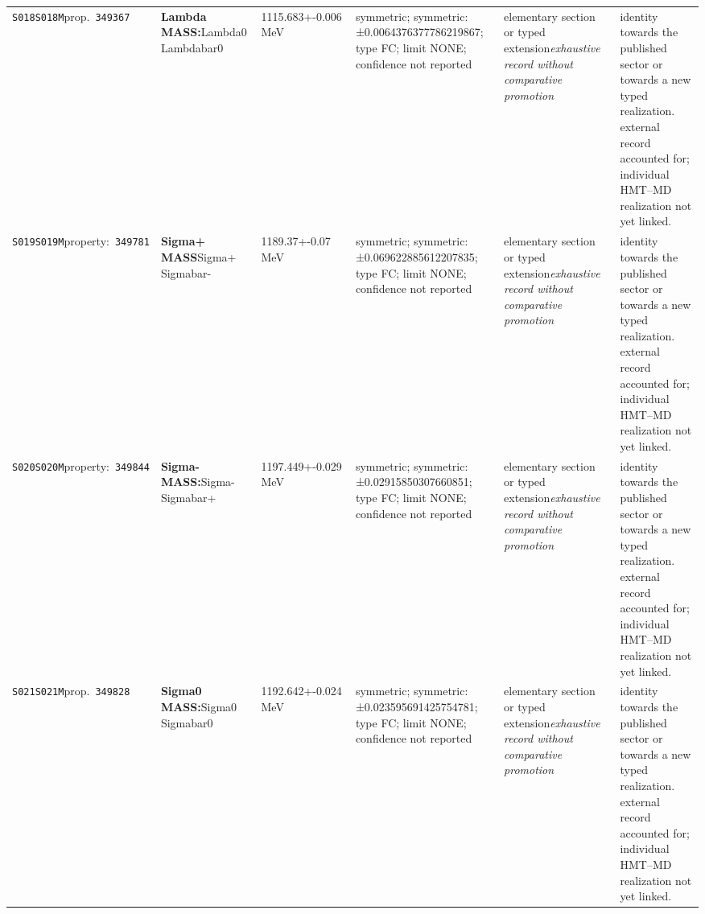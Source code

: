 \begin{landscape}
\begin{longtable}{L{1.85cm}L{4.45cm}L{2.35cm}L{4.05cm}L{3.35cm}L{7.15cm}}
\texttt{S018}\newline \texttt{S018M}\newline prop.\ \texttt{349367} & \textbf{Lambda MASS:}\newline Lambda0 \textbar{}\allowbreak{} Lambdabar0 & 1115.683+-0.006\,MeV & symmetric; symmetric: ±0.0064376377786219867; type FC; limit NONE; confidence not reported & elementary section or typed extension\newline \emph{exhaustive record without comparative promotion} & identity towards the published sector or towards a new typed realization. external record accounted for; individual HMT--MD realization not yet linked. \\
\texttt{S019}\newline \texttt{S019M}\newline property:\ \texttt{349781} & \textbf{Sigma+ MASS}\newline Sigma+ \textbar{}\allowbreak{} Sigmabar- & 1189.37+-0.07\,MeV & symmetric; symmetric: ±0.069622885612207835; type FC; limit NONE; confidence not reported & elementary section or typed extension\newline \emph{exhaustive record without comparative promotion} & identity towards the published sector or towards a new typed realization. external record accounted for; individual HMT--MD realization not yet linked. \\
\texttt{S020}\newline \texttt{S020M}\newline property:\ \texttt{349844} & \textbf{Sigma- MASS:}\newline Sigma- \textbar{}\allowbreak{} Sigmabar+ & 1197.449+-0.029\,MeV & symmetric; symmetric: ±0.02915850307660851; type FC; limit NONE; confidence not reported & elementary section or typed extension\newline \emph{exhaustive record without comparative promotion} & identity towards the published sector or towards a new typed realization. external record accounted for; individual HMT--MD realization not yet linked. \\
\texttt{S021}\newline \texttt{S021M}\newline prop.\ \texttt{349828} & \textbf{Sigma0 MASS:}\newline Sigma0 \textbar{}\allowbreak{} Sigmabar0 & 1192.642+-0.024\,MeV & symmetric; symmetric: ±0.023595691425754781; type FC; limit NONE; confidence not reported & elementary section or typed extension\newline \emph{exhaustive record without comparative promotion} & identity towards the published sector or towards a new typed realization. external record accounted for; individual HMT--MD realization not yet linked. \\

\end{longtable}
\end{landscape}
